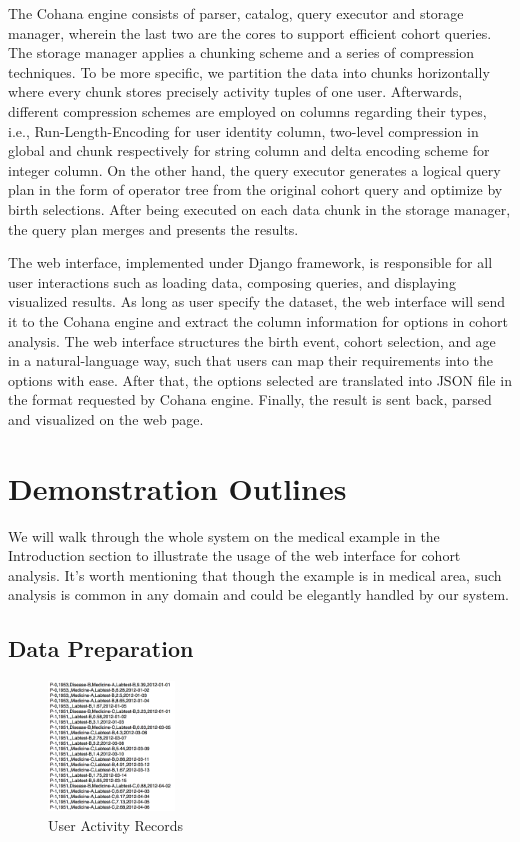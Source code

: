 \documentclass[10pt,conference,letterpaper]{IEEEtran}
\begin{document}
The Cohana engine consists of parser, catalog, query executor and storage manager, wherein the last two are the cores to support efficient cohort queries. The storage manager applies a chunking scheme and a series of compression techniques. To be more specific, we partition the data into chunks horizontally where every chunk stores precisely activity tuples of one user. Afterwards, different compression schemes are employed on columns regarding their types, i.e., Run-Length-Encoding for user identity column, two-level compression in global and chunk respectively for string column and delta encoding scheme for integer column. On the other hand, the query executor generates a logical query plan in the form of operator tree from the original cohort query and optimize by birth selections. After being executed on each data chunk in the storage manager, the query plan merges and presents the results.

The web interface, implemented under Django framework, is responsible for all user interactions such as loading data, composing queries, and displaying visualized results. As long as user specify the dataset, the web interface will send it to the Cohana engine and extract the column information for options in cohort analysis. The web interface structures the birth event, cohort selection, and age in a natural-language way, such that users can map their requirements into the options with ease. After that, the options selected are translated into JSON file in the format requested by Cohana engine. Finally, the result is sent back, parsed and visualized on the web page.

\section{Demonstration Outlines}

We will walk through the whole system on the medical example in the Introduction section to illustrate the usage of the web interface for cohort analysis. It's worth mentioning that though the example is in medical area, such analysis is common in any domain and could be elegantly handled by our system.

\subsection{Data Preparation}

\begin{figure}
    \centering
    \includegraphics[width=0.3\textwidth]{records.png}
    \caption{User Activity Records}
    \label{fig:records}
\end{figure}
\end{document}

